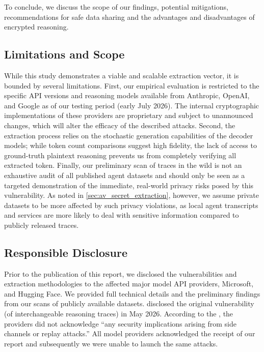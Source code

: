 To conclude, we discuss the scope of our findings, potential mitigations, recommendations for safe data sharing and the advantages and disadvantages of encrypted reasoning.

\subsection{Limitations and Scope}
While this study demonstrates a viable and scalable extraction vector, it is bounded by several limitations. First, our empirical evaluation is restricted to the specific API versions and reasoning models available from Anthropic, OpenAI, and Google as of our testing period (early July 2026). The internal cryptographic implementations of these providers are proprietary and subject to unannounced changes, which will alter the efficacy of the described attacks. Second, the extraction process relies on the stochastic generation capabilities of the decoder models; while token count comparisons suggest high fidelity, the lack of access to ground-truth plaintext reasoning prevents us from completely verifying all extracted token. Finally, our preliminary scan of traces in the wild is not an exhaustive audit of all published agent datasets and should only be seen as a targeted demonstration of the immediate, real-world privacy risks posed by this vulnerability. As noted in \cref{sec:av_secret_extraction}, however, we assume private datasets to be more affected by such privacy violations, as local agent transcripts and services are more likely to deal with sensitive information compared to publicly released traces.

\subsection{Responsible Disclosure}
 Prior to the publication of this report, we disclosed the vulnerabilities and extraction methodologies to the affected major model API providers, Microsoft, and Hugging Face. We provided full technical details and the preliminary findings from our scans of publicly available datasets. \citet{green2026encryptedreasoning} disclosed the original vulnerability (of interchangeable reasoning traces) in May 2026. According to the \citeauthor{green2026encryptedreasoning}, the providers did not acknowledge ``any security implications arising from side channels or replay attacks.'' All model providers acknowledged the receipt of our report and subsequently we were unable to launch the same attacks.

